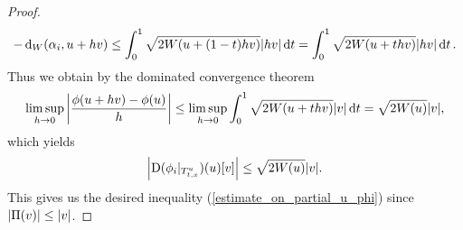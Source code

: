 \begin{proof}
\begin{equation*}
		-
		\geodesic_distance ( \alpha_{ i } , u + h v )
		\leq
		\int_{ 0 }^{ 1 }
			\sqrt{ 2 W ( u + ( 1 - t ) h v ) }
			\abs{ h v }
		\dd{ t }
		=
		\int_{ 0 }^{ 1 }
		\sqrt{ 2 W ( u + t h v ) }
		\abs{ h v }
		\dd{ t }
		.
	\end{equation*}
	Thus we obtain by the dominated convergence theorem
	\begin{equation*}
		\limsup_{ h \to 0 }
			\abs{
			\frac{ \phi ( u + h v ) - \phi ( u ) }{ h }
			}
		\leq
		\limsup_{ h \to 0 }
			\int_{ 0 }^{ 1 }
				\sqrt{ 2 W ( u + t h v ) }
				\abs{ v }
			\dd{ t }
		= 
		\sqrt{ 2 W ( u ) } \abs{ v },
	\end{equation*}
	which yields
	\begin{equation*}
		\abs{ \operatorname{D}  ( \phi_{ i } |_{ T_{ t, x }^{ u } } ) ( u ) [ v ] }
		\leq
		\sqrt{ 2 W ( u ) } \abs{ v }.
	\end{equation*}
	This gives us the desired inequality (\ref{estimate_on_partial_u_phi}) 
	since $ \abs{ \Pi ( v ) } \leq \abs{ v } $.
	

\end{proof}
